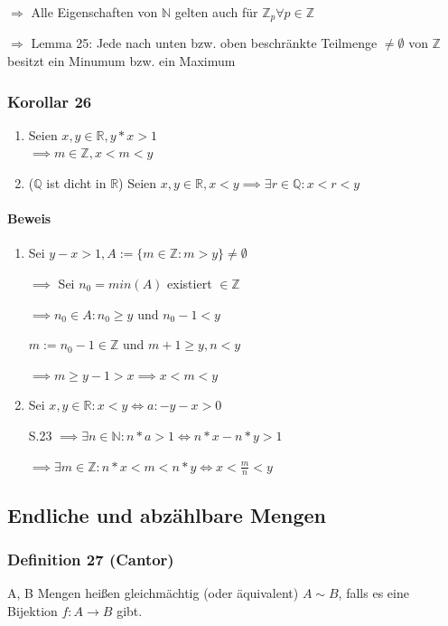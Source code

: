 \documentclass[fleqn]{scrartcl}
\begin{document}
$\Rightarrow$ Alle Eigenschaften von $\mathbb{N}$ gelten auch für $\mathbb{Z}_p \forall p \in \mathbb{Z}$

$\Rightarrow$ Lemma 25: Jede nach unten bzw. oben beschränkte Teilmenge $\neq \emptyset$ von $\mathbb{Z}$ besitzt ein Minumum bzw. ein Maximum
\subsubsection{Korollar 26}
\begin{enumerate}[1)]
\item Seien $x,y \in \mathbb{R}, y*x > 1$\\$\implies m\in\mathbb{Z}, x < m < y$
\item ($\mathbb{Q}$ ist dicht in $\mathbb{R}$) Seien $x,y \in \mathbb{R}, x < y \implies \exists r \in \mathbb{Q}: x < r <y$
\end{enumerate}
\paragraph{Beweis} 
\begin{enumerate}[1)]
\item Sei $y - x > 1, A := \{ m \in \mathbb{Z}: m > y\} \neq \emptyset$

$\implies$ Sei $n_0 = min(A)$ existiert $\in \mathbb{Z}$

$\implies n_0 \in A: n_0 \geq y$ und $n_0 -1 < y$

$m:=n_0 -1 \in \mathbb{Z}$ und $m + 1 \geq y, n <y$

$\implies m \geq y -1 > x \implies x < m < y$

\item Sei $x,y \in \mathbb{R}: x < y \iff a: -y -x > 0$

S.23 $\implies \exists n \in \mathbb{N}: n * a > 1 \iff n * x - n * y > 1$

$\implies \exists m \in \mathbb{Z}: n*x<m<n*y \iff x <\frac{m}{n} < y$
\end{enumerate}

\subsection{Endliche und abzählbare Mengen}

\subsubsection{Definition 27 (Cantor)} A, B Mengen heißen gleichmächtig (oder äquivalent) $A \sim B$, falls es eine Bijektion $f: A \rightarrow B$ gibt.
\end{document}
